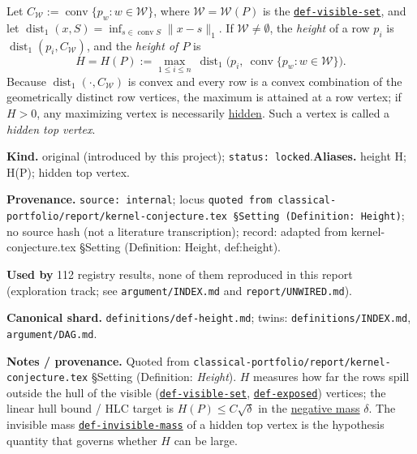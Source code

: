 \hypertarget{def:height}{}%
\begin{definition}\label{def:height}
Let $C_{\mathcal W}:=\operatorname{conv}\{p_w:w\in\mathcal W\}$, where $\mathcal W=\mathcal W(P)$
is the \hyperref[def:visible-set]{\texttt{def-\allowbreak{}visible-\allowbreak{}set}}, and let $\operatorname{dist}_1(x,S)=\inf_{s\in\operatorname{conv}S}\lVert x-s\rVert_1$.
If $\mathcal W\neq\emptyset$, the \emph{height} of a row $p_i$ is $\operatorname{dist}_1(p_i,C_{\mathcal W})$, and
the \emph{height of $P$} is
\[H=H(P):=\max_{1\le i\le n}\ \operatorname{dist}_1\!\big(p_i,\ \operatorname{conv}\{p_w:w\in\mathcal W\}\big).\]
Because $\operatorname{dist}_1(\cdot,C_{\mathcal W})$ is convex and every row is a convex combination of the
geometrically distinct row vertices, the maximum is attained at a row vertex; if $H>0$, any maximizing
vertex is necessarily \hyperref[def:exposed]{hidden}. Such a vertex is called a \emph{hidden top vertex}.
\end{definition}
\begin{defnote}
\textbf{Kind.} original (introduced by this project); \texttt{status: locked}.\quad\textbf{Aliases.} height H; H(P); hidden top vertex.
\par
\textbf{Provenance.} \texttt{source: internal}; locus \texttt{quoted from classical-\allowbreak{}portfolio/\allowbreak{}report/\allowbreak{}kernel-\allowbreak{}conjecture.\allowbreak{}tex \S{}Setting (Definition:\allowbreak{} Height)}; no source hash (not a literature transcription); record: adapted from kernel-\allowbreak{}conjecture.\allowbreak{}tex \S{}Setting (Definition:\allowbreak{} Height,\allowbreak{} def:\allowbreak{}height).
\par
\textbf{Used by} 112 registry results, none of them reproduced in this report (exploration track; see \texttt{argument/INDEX.md} and \texttt{report/UNWIRED.md}).
\par
\textbf{Canonical shard.} \texttt{definitions/\allowbreak{}def-\allowbreak{}height.\allowbreak{}md}; twins: \texttt{definitions/INDEX.md}, \texttt{argument/DAG.md}.
\par
\textbf{Notes / provenance.} Quoted from \texttt{classical-\allowbreak{}portfolio/\allowbreak{}report/\allowbreak{}kernel-\allowbreak{}conjecture.\allowbreak{}tex} \S{}Setting
(Definition: \emph{Height}). $H$ measures how far the rows spill outside the hull of the visible
(\hyperref[def:visible-set]{\texttt{def-\allowbreak{}visible-\allowbreak{}set}}, \hyperref[def:exposed]{\texttt{def-\allowbreak{}exposed}}) vertices; the linear hull bound / HLC target is
$H(P)\le C\sqrt\delta$ in the \hyperref[def:negative-mass]{negative mass} $\delta$. The invisible mass
\hyperref[def:invisible-mass]{\texttt{def-\allowbreak{}invisible-\allowbreak{}mass}} of a hidden top vertex is the hypothesis quantity that governs whether $H$ can be
large.
\end{defnote}

